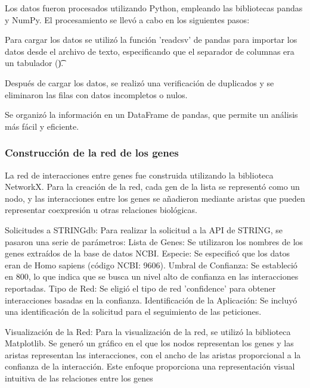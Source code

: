 Los datos fueron procesados utilizando Python, empleando las bibliotecas pandas y NumPy. El procesamiento se llevó a cabo en los siguientes pasos:

Para cargar los datos se utilizó la función 'readcsv' de pandas para importar los datos desde el archivo de texto, especificando que el separador de columnas era un tabulador (\t).

Después de cargar los datos, se realizó una verificación de duplicados y se eliminaron las filas con datos incompletos o nulos.

Se organizó la información en un DataFrame de pandas, que permite un análisis más fácil y eficiente.

\subsubsection{\textbf{Construcción de la red de los genes}}

La red de interacciones entre genes fue construida utilizando la biblioteca NetworkX. Para la creación de la red, cada gen de la lista se representó como un nodo, y las interacciones entre los genes se añadieron mediante aristas que pueden representar coexpresión u otras relaciones biológicas.

Solicitudes a STRINGdb: Para realizar la solicitud a la API de STRING, se pasaron una serie de parámetros: Lista de Genes: Se utilizaron los nombres de los genes extraídos de la base de datos NCBI. Especie: Se especificó que los datos eran de Homo sapiens (código NCBI: 9606). Umbral de Confianza: Se estableció en 800, lo que indica que se busca un nivel alto de confianza en las interacciones reportadas. Tipo de Red: Se eligió el tipo de red 'confidence' para obtener interacciones basadas en la confianza. Identificación de la Aplicación: Se incluyó una identificación de la solicitud para el seguimiento de las peticiones. 

Visualización de la Red: Para la visualización de la red, se utilizó la biblioteca Matplotlib. Se generó un gráfico en el que los nodos representan los genes y las aristas representan las interacciones, con el ancho de las aristas proporcional a la confianza de la interacción. Este enfoque proporciona una representación visual intuitiva de las relaciones entre los genes





